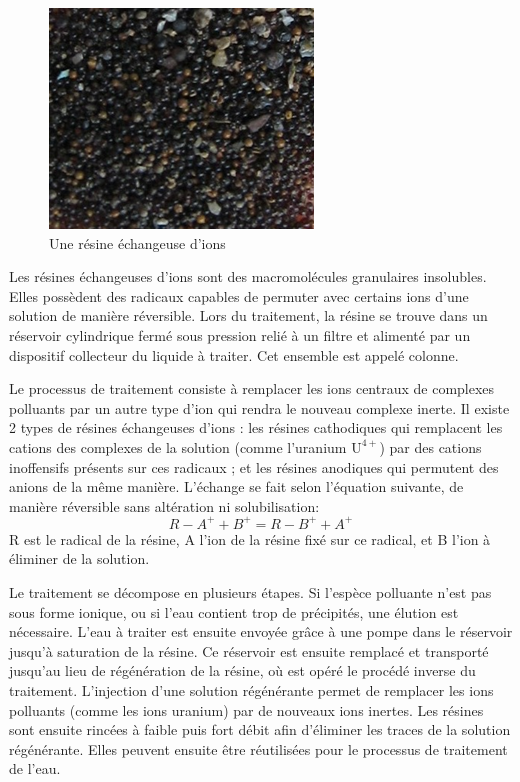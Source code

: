 \documentclass{article}
\begin{document}
\begin{figure}[H]
\centering
\includegraphics[]{III_A_2.png}
\caption{Une résine échangeuse d'ions}
\label{fig:resine_echangeuse_ions}
\end{figure}

Les résines échangeuses d’ions sont des macromolécules granulaires insolubles. Elles possèdent des radicaux capables de permuter avec certains ions d’une solution de manière réversible. Lors du traitement, la résine se trouve dans un réservoir cylindrique fermé sous pression relié à un filtre et alimenté par un dispositif collecteur du liquide à traiter. Cet ensemble est appelé colonne.

Le processus de traitement consiste à remplacer les ions centraux de complexes polluants par un autre type d’ion qui rendra le nouveau complexe inerte. Il existe 2 types de résines échangeuses d’ions : les résines cathodiques qui remplacent les cations des complexes de la solution (comme l’uranium $\text{U}^{4+}$) par des cations inoffensifs présents sur ces radicaux ; et les résines anodiques qui permutent des anions de la même manière.
L’échange se fait selon l’équation suivante, de manière réversible sans altération ni solubilisation:
$$R-A^+ + B^+ = R-B^+ + A^+$$
R est le radical de la résine, A l’ion de la résine fixé sur ce radical, et B l’ion à éliminer de la solution.

Le traitement se décompose en plusieurs étapes. Si l’espèce polluante n’est pas sous forme ionique, ou si l’eau contient trop de précipités, une élution est nécessaire. L’eau à traiter est ensuite envoyée grâce à une pompe dans le réservoir jusqu’à saturation de la résine. Ce réservoir est ensuite remplacé et transporté jusqu’au lieu de régénération de la résine, où est opéré le procédé inverse du traitement. L’injection d’une solution régénérante permet de remplacer les ions polluants (comme les ions uranium) par de nouveaux ions inertes. Les résines sont ensuite rincées à faible puis fort débit afin d’éliminer les traces de la solution régénérante. Elles peuvent ensuite être réutilisées pour le processus de traitement de l’eau.
\end{document}

